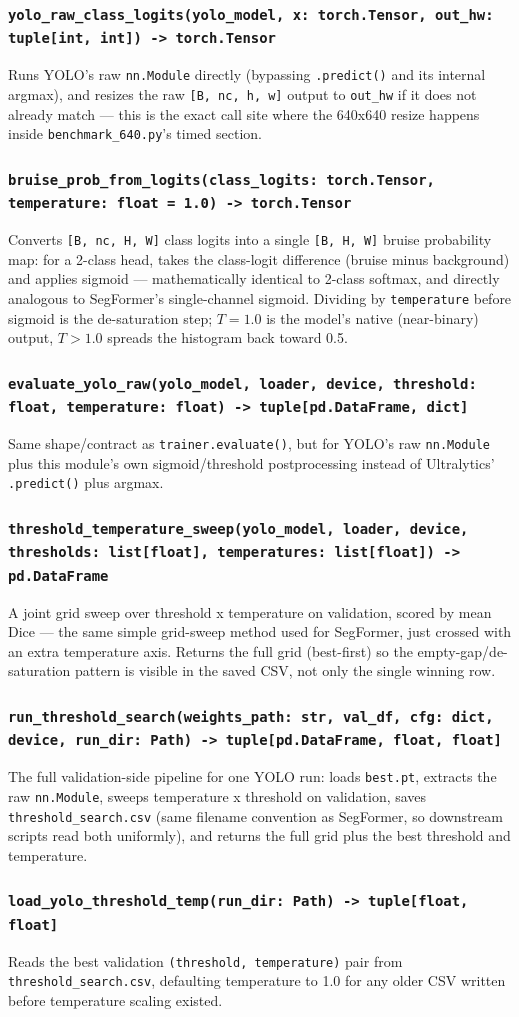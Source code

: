 \documentclass[11pt]{article}
\newcommand{\func}[1]{\subsubsection*{\texttt{#1}}}
\begin{document}
\func{yolo\_raw\_class\_logits(yolo\_model, x: torch.Tensor, out\_hw: tuple[int, int]) -> torch.Tensor}
Runs YOLO's raw \texttt{nn.Module} directly (bypassing \texttt{.predict()} and
its internal argmax), and resizes the raw \texttt{[B, nc, h, w]} output to
\texttt{out\_hw} if it does not already match --- this is the exact call site
where the 640x640 resize happens inside \texttt{benchmark\_640.py}'s timed
section.

\func{bruise\_prob\_from\_logits(class\_logits: torch.Tensor, temperature: float = 1.0) -> torch.Tensor}
Converts \texttt{[B, nc, H, W]} class logits into a single \texttt{[B, H, W]}
bruise probability map: for a 2-class head, takes the class-logit difference
(bruise minus background) and applies sigmoid --- mathematically identical to
2-class softmax, and directly analogous to SegFormer's single-channel sigmoid.
Dividing by \texttt{temperature} before sigmoid is the de-saturation step;
$T=1.0$ is the model's native (near-binary) output, $T>1.0$ spreads the
histogram back toward 0.5.

\func{evaluate\_yolo\_raw(yolo\_model, loader, device, threshold: float, temperature: float) -> tuple[pd.DataFrame, dict]}
Same shape/contract as \texttt{trainer.evaluate()}, but for YOLO's raw
\texttt{nn.Module} plus this module's own sigmoid/threshold postprocessing
instead of Ultralytics' \texttt{.predict()} plus argmax.

\func{threshold\_temperature\_sweep(yolo\_model, loader, device, thresholds: list[float], temperatures: list[float]) -> pd.DataFrame}
A joint grid sweep over threshold x temperature on validation, scored by mean
Dice --- the same simple grid-sweep method used for SegFormer, just crossed
with an extra temperature axis. Returns the full grid (best-first) so the
empty-gap/de-saturation pattern is visible in the saved CSV, not only the
single winning row.

\func{run\_threshold\_search(weights\_path: str, val\_df, cfg: dict, device, run\_dir: Path) -> tuple[pd.DataFrame, float, float]}
The full validation-side pipeline for one YOLO run: loads \texttt{best.pt},
extracts the raw \texttt{nn.Module}, sweeps temperature x threshold on
validation, saves \texttt{threshold\_search.csv} (same filename convention as
SegFormer, so downstream scripts read both uniformly), and returns the full
grid plus the best threshold and temperature.

\func{load\_yolo\_threshold\_temp(run\_dir: Path) -> tuple[float, float]}
Reads the best validation \texttt{(threshold, temperature)} pair from
\texttt{threshold\_search.csv}, defaulting temperature to 1.0 for any older CSV
written before temperature scaling existed.
\end{document}
